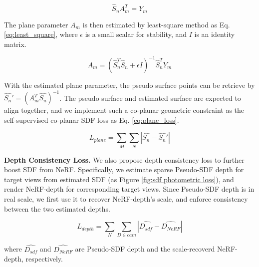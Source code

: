 \vspace{-3mm}
\begin{equation}
    \hat{S}_{n} A_{m}^T  = Y_{m}
    \label{eq:plane_npoint}
\end{equation}
\vspace{-5mm}

The plane parameter $A_{m}$ is then estimated by least-square method as Eq. \ref{eq:least_square}, where $\epsilon$ is a small scalar for stability, and $I$ is an identity matrix.

\vspace{-3mm}
\begin{equation}
    A_m = (\hat{S}_n^T\hat{S}_n+\epsilon I)^{-1}\hat{S}_n^TY_m
    \label{eq:least_square}
\end{equation}
\vspace{-5mm}

With the estimated plane parameter, the pseudo surface points can be retrieve  by $\hat{S_n}' = (A_m^T \hat{S_n})^{-1}$. The pseudo surface and estimated surface are expected to align together, and we implement such a co-planar geometric constraint as the self-supervised co-planar SDF loss as Eq. \ref{eq:plane_loss}.

\vspace{-3mm}
\begin{equation}
    L_{plane} = \sum_{M}\sum_{N}{|\hat{S_n}-\hat{S_n}'|}
\label{eq:plane_loss}
\end{equation}
\vspace{-3mm}

\noindent
\textbf{Depth Consistency Loss.} We also propose depth consistency loss to further boost SDF from NeRF. Specifically, we estimate sparse Pseudo-SDF depth for target views from estimated SDF (as Figure \ref{fig:sdf photometric loss}), and render NeRF-depth for corresponding target views. Since Pseudo-SDF depth is in real scale, we first use it to recover NeRF-depth's scale, and enforce consistency between the two estimated depths. 

\vspace{-3mm}
\begin{equation}
    L_{depth} = \sum_{N}\sum_{D \in cam}{|\hat{D_{sdf}}-\hat{D_{NeRF}}|}
\label{eq:depth_loss}
\end{equation}
\vspace{-3mm}

\noindent
where $\hat{D_{sdf}}$ and $\hat{D_{NeRF}}$ are Pseudo-SDF depth and the scale-recoverd NeRF-depth, respectively.

